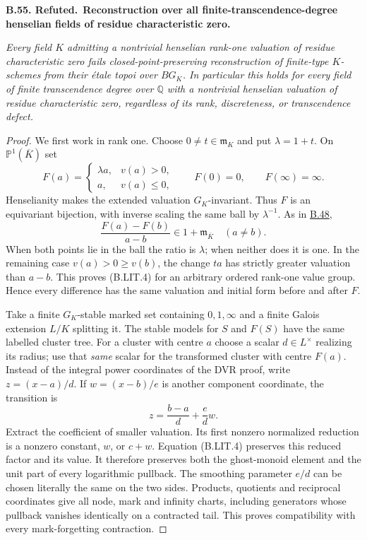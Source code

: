 \documentclass[11pt,a4paper]{article}
\newenvironment{claim}[3]{\par\medskip\noindent\hypertarget{#1}{\textbf{#1. #2.}}\ \textbf{#3.}\par\nopagebreak\smallskip\begingroup\itshape}{\endgroup\par\smallskip}
\newcommand{\statementref}[1]{\hyperlink{#1}{#1}}
\begin{document}
\begin{claim}{B.55}{Refuted}{Reconstruction over all finite-transcendence-degree henselian fields of residue characteristic zero}
Every field $K$ admitting a nontrivial henselian rank-one valuation
of residue characteristic zero fails closed-point-preserving
reconstruction of finite-type $K$-schemes from their \'etale topoi
over $BG_K$. In particular this holds for every field of finite
transcendence degree over $\mathbb Q$ with a nontrivial henselian
valuation of residue characteristic zero, regardless of its rank,
discreteness, or transcendence defect.
\end{claim}
\begin{proof}
We first work in rank one. Choose $0\ne t\in\mathfrak m_K$ and
put $\lambda=1+t$. On $\mathbb P^1(\overline K)$ set
\[
 F(a)=\begin{cases}\lambda a,&v(a)>0,\\a,&v(a)\leq0,\end{cases}
 \qquad F(0)=0,\qquad F(\infty)=\infty.
                                                        \tag{B.LIT.3}
\]
Henselianity makes the extended valuation $G_K$-invariant.
Thus $F$ is an equivariant bijection, with inverse scaling the
same ball by $\lambda^{-1}$. As in \statementref{B.48},
\[
       \frac{F(a)-F(b)}{a-b}\in1+\mathfrak m_{\overline K}
       \quad(a\ne b).                                  \tag{B.LIT.4}
\]
When both points lie in the ball the ratio is $\lambda$; when
neither does it is one. In the remaining case
$v(a)>0\geq v(b)$, the change $ta$ has strictly greater
valuation than $a-b$. This proves (B.LIT.4) for an arbitrary
ordered rank-one value group. Hence every difference has the same
valuation and initial form before and after $F$.

Take a finite $G_K$-stable marked set containing $0,1,\infty$
and a finite Galois extension $L/K$ splitting it. The stable
models for $S$ and $F(S)$ have the same labelled cluster tree.
For a cluster with centre $a$ choose a scalar $d\in L^\times$
realizing its radius; use that \emph{same} scalar for the
transformed cluster with centre $F(a)$. Instead of the integral
power coordinates of the DVR proof, write $z=(x-a)/d$. If
$w=(x-b)/e$ is another component coordinate, the transition is
\[
                  z=\frac{b-a}{d}+\frac ed w.            \tag{B.LIT.5}
\]
Extract the coefficient of smaller valuation. Its first nonzero
normalized reduction is a nonzero constant, $w$, or $c+w$.
Equation (B.LIT.4) preserves this reduced factor and its value.
It therefore preserves both the ghost-monoid element and the
unit part of every logarithmic pullback. The smoothing parameter
$e/d$ can be chosen literally the same on the two sides.
Products, quotients and reciprocal coordinates give all node,
mark and infinity charts, including generators whose pullback
vanishes identically on a contracted tail. This proves
compatibility with every mark-forgetting contraction.


\end{proof}
\end{document}
